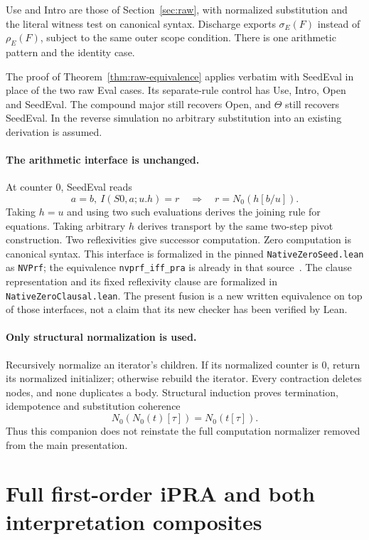 \documentclass[11pt,letterpaper]{article}
\theoremstyle{definition}\newtheorem{definition}[theorem]{Definition}
\theoremstyle{remark}\newtheorem{remark}[theorem]{Remark}
\begin{document}
Use and Intro are those of Section~\ref{sec:raw}, with normalized
substitution and the literal witness test on canonical syntax. Discharge
exports $\sigma_E(F)$ instead of $\rho_E(F)$, subject to the same outer
scope condition. There is one arithmetic pattern and the identity case.

The proof of Theorem~\ref{thm:raw-equivalence} applies verbatim with
SeedEval in place of the two raw Eval cases. Its separate-rule control has
Use, Intro, Open and SeedEval. The compound major still recovers Open, and
$\Theta$ still recovers SeedEval. In the reverse simulation no arbitrary
substitution into an existing derivation is assumed.

\paragraph{The arithmetic interface is unchanged.}
At counter $0$, SeedEval reads
\[
             a=b,\ I(S0,a;u.h)=r\quad\Longrightarrow\quad r=N_0(h[b/u]).
\]
Taking $h=u$ and using two such evaluations derives the joining rule for
equations. Taking arbitrary $h$ derives transport by the same two-step
pivot construction. Two reflexivities give successor computation.
Zero computation is canonical syntax. This interface is formalized in the
pinned \texttt{NativeZeroSeed.lean} as \texttt{NVPrf}; the equivalence
\texttt{nvprf\_iff\_pra} is already in that source~\cite{zeroformal}.
The clause representation and its fixed reflexivity clause are formalized
in \texttt{NativeZeroClausal.lean}. The present fusion is a new written
equivalence on top of those interfaces, not a claim that its new checker
has been verified by Lean.

\paragraph{Only structural normalization is used.}
Recursively normalize an iterator's children. If its normalized counter is
$0$, return its normalized initializer; otherwise rebuild the iterator.
Every contraction deletes nodes, and none duplicates a body. Structural
induction proves termination, idempotence and substitution coherence
\[
              N_0(N_0(t)[\tau])=N_0(t[\tau]).
\]
Thus this companion does not reinstate the full computation normalizer
removed from the main presentation.

\section{Full first-order iPRA and both interpretation composites}
\label{sec:interpretations}
\end{document}
